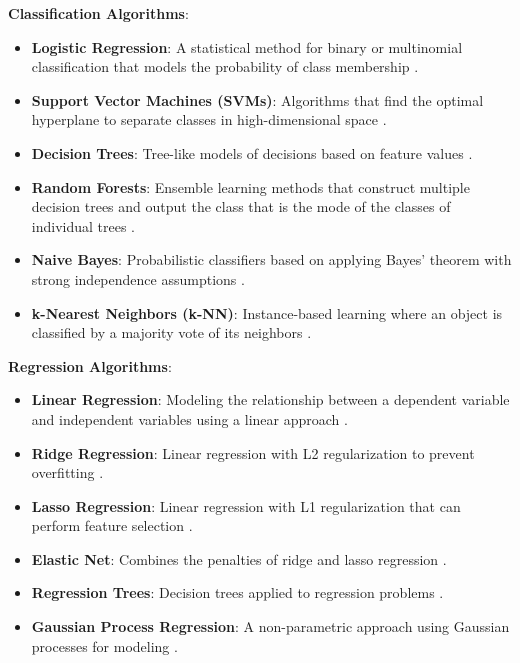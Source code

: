 \textbf{Classification Algorithms}:
\begin{itemize}
  \item \textbf{Logistic Regression}: A statistical method for binary or multinomial classification that models the probability of class membership \cite{hosmer2013applied}.
  \item \textbf{Support Vector Machines (SVMs)}: Algorithms that find the optimal hyperplane to separate classes in high-dimensional space \cite{cortes1995support}.
  \item \textbf{Decision Trees}: Tree-like models of decisions based on feature values \cite{quinlan1986induction}.
  \item \textbf{Random Forests}: Ensemble learning methods that construct multiple decision trees and output the class that is the mode of the classes of individual trees \cite{breiman2001random}.
  \item \textbf{Naive Bayes}: Probabilistic classifiers based on applying Bayes' theorem with strong independence assumptions \cite{rish2001empirical}.
  \item \textbf{k-Nearest Neighbors (k-NN)}: Instance-based learning where an object is classified by a majority vote of its neighbors \cite{cover1967nearest}.
\end{itemize}

\textbf{Regression Algorithms}:
\begin{itemize}
  \item \textbf{Linear Regression}: Modeling the relationship between a dependent variable and independent variables using a linear approach \cite{montgomery2021introduction}.
  \item \textbf{Ridge Regression}: Linear regression with L2 regularization to prevent overfitting \cite{hoerl1970ridge}.
  \item \textbf{Lasso Regression}: Linear regression with L1 regularization that can perform feature selection \cite{tibshirani1996regression}.
  \item \textbf{Elastic Net}: Combines the penalties of ridge and lasso regression \cite{zou2005regularization}.
  \item \textbf{Regression Trees}: Decision trees applied to regression problems \cite{breiman1984classification}.
  \item \textbf{Gaussian Process Regression}: A non-parametric approach using Gaussian processes for modeling \cite{rasmussen2003gaussian}.
\end{itemize}

